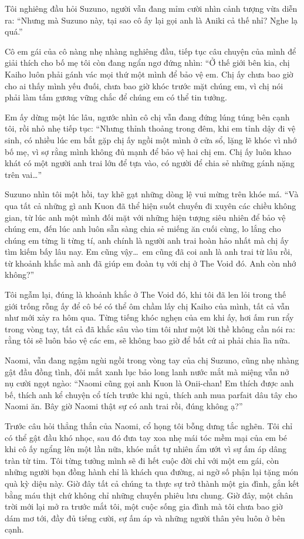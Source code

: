﻿\documentclass[../main.tex]{subfiles}
\begin{document}
Tôi nghiêng đầu hỏi Suzuno, người vẫn đang mỉm cười nhìn cảnh tượng vừa diễn ra: ``Nhưng mà Suzuno này, tại sao cô ấy lại gọi anh là Aniki cả thế nhỉ? Nghe lạ quá.''

Cô em gái của cô nàng nhẹ nhàng nghiêng đầu, tiếp tục câu chuyện của mình để giải thích cho bố mẹ tôi còn đang ngẩn ngơ đứng nhìn: ``Ở thế giới bên kia, chị Kaiho luôn phải gánh vác mọi thứ một mình để bảo vệ em. Chị ấy chưa bao giờ cho ai thấy mình yếu đuối, chưa bao giờ khóc trước mặt chúng em, vì chị nói phải làm tấm gương vững chắc để chúng em có thể tin tưởng.

Em ấy dừng một lúc lâu, ngước nhìn cô chị vẫn đang đứng lúng túng bên cạnh tôi, rồi nhỏ nhẹ tiếp tục: ``Nhưng thỉnh thoảng trong đêm, khi em tỉnh dậy đi vệ sinh, có nhiều lúc em bắt gặp chị ấy ngồi một mình ở cửa sổ, lặng lẽ khóc vì nhớ bố mẹ, vì sợ rằng mình không đủ mạnh để bảo vệ hai chị em. Chị ấy luôn khao khát có một người anh trai lớn để tựa vào, có người để chia sẻ những gánh nặng trên vai\dots''

Suzuno nhìn tôi một hồi, tay khẽ gạt những dòng lệ vui mừng trên khóe má. ``Và qua tất cả những gì anh Kuon đã thể hiện suốt chuyến đi xuyên các chiều không gian, từ lúc anh một mình đối mặt với những hiện tượng siêu nhiên để bảo vệ chúng em, đến lúc anh luôn sẵn sàng chia sẻ miếng ăn cuối cùng, lo lắng cho chúng em từng li từng tí, anh chính là người anh trai hoàn hảo nhất mà chị ấy tìm kiếm bấy lâu nay. Em cũng vậy\dots\ em cũng đã coi anh là anh trai từ lâu rồi, từ khoảnh khắc mà anh đã giúp em đoàn tụ với chị ở The Void đó. Anh còn nhớ không?''

Tôi ngẫm lại, đúng là khoảnh khắc ở The Void đó, khi tôi đã len lỏi trong thế giới trống rỗng ấy để cô bé có thể ôm chầm lấy chị Kaiho của mình, tất cả vẫn như mới xảy ra hôm qua. Từng tiếng khóc nghẹn của em khi ấy, hơi ấm run rẩy trong vòng tay, tất cả đã khắc sâu vào tim tôi như một lời thề không cần nói ra: rằng tôi sẽ luôn bảo vệ các em, sẽ không bao giờ để bất cứ ai phải chia lìa nữa.

Naomi, vẫn đang ngậm ngùi ngồi trong vòng tay của chị Suzuno, cũng nhẹ nhàng gật đầu đồng tình, đôi mắt xanh lục bảo long lanh nước mắt mà miệng vẫn nở nụ cười ngọt ngào: ``Naomi cũng gọi anh Kuon là Onii-chan! Em thích được anh bế, thích anh kể chuyện cổ tích trước khi ngủ, thích anh mua parfait dâu tây cho Naomi ăn. Bây giờ Naomi thật sự có anh trai rồi, đúng không ạ?''

Trước câu hỏi thẳng thắn của Naomi, cổ họng tôi bỗng dưng tắc nghẽn. Tôi chỉ có thể gật đầu khó nhọc, sau đó đưa tay xoa nhẹ mái tóc mềm mại của em bé khi cô ấy ngẩng lên một lần nữa, khóe mắt tự nhiên ẩm ướt vì sự ấm áp dâng tràn từ tim. Tôi từng tưởng mình sẽ đi hết cuộc đời chỉ với một em gái, còn những người bạn đồng hành chỉ là khách qua đường, ai ngờ số phận lại tặng món quà kỳ diệu này. Giờ đây tất cả chúng ta thực sự trở thành một gia đình, gắn kết bằng máu thịt chứ không chỉ những chuyến phiêu lưu chung. Giờ đây, một chân trời mới lại mở ra trước mắt tôi, một cuộc sống gia đình mà tôi chưa bao giờ dám mơ tới, đầy đủ tiếng cười, sự ấm áp và những người thân yêu luôn ở bên cạnh.
\end{document}
